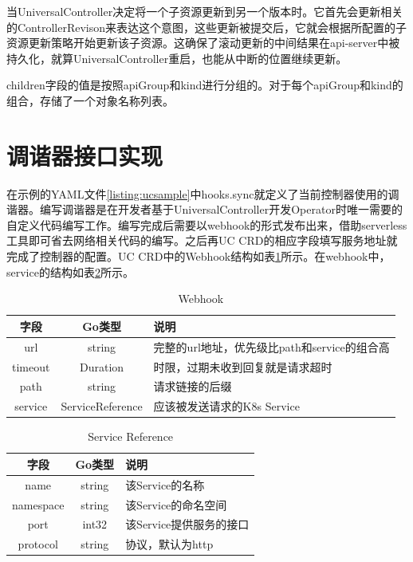 \documentclass[macfonts,master]{njuthesis}
\begin{document}
当UniversalController决定将一个子资源更新到另一个版本时。它首先会更新相关的ControllerRevison来表达这个意图，这些更新被提交后，它就会根据所配置的子资源更新策略开始更新该子资源。这确保了滚动更新的中间结果在api-server中被持久化，就算UniversalController重启，也能从中断的位置继续更新。

children字段的值是按照apiGroup和kind进行分组的。对于每个apiGroup和kind的组合，存储了一个对象名称列表。
\section{调谐器接口实现}
在示例的YAML文件\ref{listing:ucsample}中hooks.sync就定义了当前控制器使用的调谐器。编写调谐器是在开发者基于UniversalController开发Operator时唯一需要的自定义代码编写工作。编写完成后需要以webhook的形式发布出来，借助serverless工具即可省去网络相关代码的编写。之后再UC CRD的相应字段填写服务地址就完成了控制器的配置。UC CRD中的Webhook结构如表\ref{table:webhook}所示。在webhook中，service的结构如表\ref{table:service-reference}所示。

\begin{table}
  \centering
  \begin{tabular}{ccp{50mm}}
    \toprule
    \textbf{字段} & \textbf{Go类型} & \textbf{说明} \\
    \midrule
    url  & string  & 完整的url地址，优先级比path和service的组合高\\
    timeout  & Duration   &  时限，过期未收到回复就是请求超时 \\
    path     & string  &  请求链接的后缀 \\
    service    & ServiceReference   &  应该被发送请求的K8s Service \\
    \bottomrule
  \end{tabular}
  \caption{Webhook}\label{table:webhook}
\end{table}

\begin{table}
  \centering
  \begin{tabular}{ccp{50mm}}
    \toprule
    \textbf{字段} & \textbf{Go类型} & \textbf{说明} \\
    \midrule
    name  & string  & 该Service的名称\\
    namespace  & string   &  该Service的命名空间 \\
    port     & int32  & 该Service提供服务的接口 \\
    protocol    & string   &  协议，默认为http \\
    \bottomrule
  \end{tabular}
  \caption{Service Reference}\label{table:service-reference}
\end{table}
\end{document}

